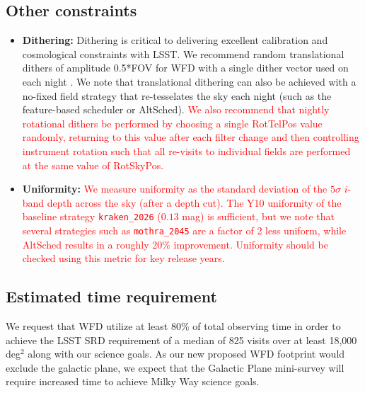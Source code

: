 \documentclass[12pt, letterpaper]{article}
\newcommand{\review}[1]{{\textcolor{red}{#1}}}
\begin{document}
\subsection{Other constraints}
\begin{itemize}
\item {\bfseries Dithering: }Dithering is critical to delivering excellent 
calibration and 
cosmological constraints with LSST. We recommend random translational dithers of amplitude 0.5*FOV for WFD with a single dither vector used on each night \cite{awan2016, carroll2014}.  We note that translational dithering can also be achieved with a no-fixed field strategy that re-tesselates the sky each night (such as the feature-based scheduler or AltSched). \review{We also recommend that nightly rotational dithers be performed by choosing a single RotTelPos value randomly, returning to this value after each filter change and then controlling instrument rotation such that all re-visits to individual fields are performed at the same value of RotSkyPos.} 
\item {\bfseries Uniformity: }\review{We measure uniformity as the standard deviation of the $5\sigma$ $i$-band depth across the sky (after a depth cut). The Y10 uniformity of the baseline strategy \texttt{kraken\_2026} ($0.13$ mag) is sufficient, but we note that several strategies such as \texttt{mothra\_2045} are a factor of 2 less uniform, while AltSched results in a roughly 20\% improvement. Uniformity should be checked using this metric for key release years.}

\end{itemize}
\subsection{Estimated time requirement}
We request that WFD utilize at least 80\% of total observing time
in order to achieve the LSST SRD requirement of a median of 825 visits over at least 18,000 deg$^2$ along with our science goals.  
As our new proposed WFD footprint would exclude the galactic plane, we expect that the Galactic Plane mini-survey will require increased time to achieve Milky Way science goals. 
\end{document}
